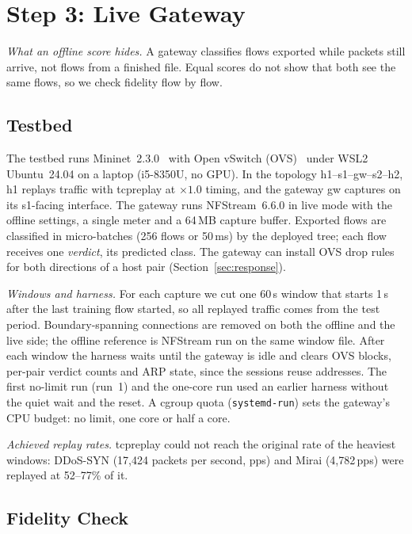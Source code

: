\section{Step 3: Live Gateway}\label{sec:live}

\emph{What an offline score hides.} A gateway classifies flows exported while packets still arrive, not flows from a finished file. Equal scores do not show that both see the same flows, so we check fidelity flow by flow.

\subsection{Testbed}\label{sec:testbed}

The testbed runs Mininet~2.3.0~\cite{lantz2010mininet} with Open vSwitch (OVS)~\cite{pfaff2015ovs} under WSL2 Ubuntu~24.04 on a laptop (i5-8350U, no GPU). In the topology h1--s1--gw--s2--h2, h1 replays traffic with tcpreplay at $\times1.0$ timing, and the gateway gw captures on its s1-facing interface. The gateway runs NFStream~6.6.0 in live mode with the offline settings, a single meter and a 64\,MB capture buffer. Exported flows are classified in micro-batches (256 flows or 50\,ms) by the deployed tree; each flow receives one \emph{verdict}, its predicted class. The gateway can install OVS drop rules for both directions of a host pair (Section~\ref{sec:response}).

\emph{Windows and harness.} For each capture we cut one 60\,s window that starts 1\,s after the last training flow started, so all replayed traffic comes from the test period. Boundary-spanning connections are removed on both the offline and the live side; the offline reference is NFStream run on the same window file. After each window the harness waits until the gateway is idle and clears OVS blocks, per-pair verdict counts and ARP state, since the sessions reuse addresses. The first no-limit run (run~1) and the one-core run used an earlier harness without the quiet wait and the reset. A cgroup quota (\texttt{systemd-run}) sets the gateway's CPU budget: no limit, one core or half a core.

\emph{Achieved replay rates.} tcpreplay could not reach the original rate of the heaviest windows: DDoS-SYN (17,424 packets per second, pps) and Mirai (4,782\,pps) were replayed at 52--77\% of it.

\subsection{Fidelity Check}\label{sec:fidelity}

